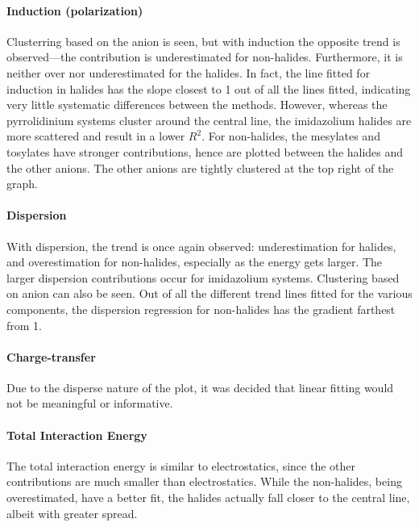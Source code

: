 \paragraph{Induction (polarization)}
Clusterring based on the anion is seen, but with induction the opposite trend is observed---the contribution is underestimated for non-halides.
Furthermore, it is neither over nor underestimated for the halides.
In fact, the line fitted for induction in halides has the slope closest to 1 out of all the lines fitted, indicating very little systematic differences between the methods.
However, whereas the pyrrolidinium systems cluster around the central line, the imidazolium halides are more scattered and result in a lower $R^2$.
For non-halides, the mesylates and tosylates have stronger contributions, hence are plotted between the halides and the other anions. 
The other anions are tightly clustered at the top right of the graph.

\paragraph{Dispersion}
With dispersion, the trend is once again observed: underestimation for halides, and overestimation for non-halides, especially as the energy gets larger.
The larger dispersion contributions occur for imidazolium systems.
Clustering based on anion can also be seen.
Out of all the different trend lines fitted for the various components, the dispersion regression for non-halides has the gradient farthest from 1. 

\paragraph{Charge-transfer}
Due to the disperse nature of the plot, it was decided that linear fitting would not be meaningful or informative.

\paragraph{Total Interaction Energy}
The total interaction energy is similar to electrostatics, since the other contributions are much smaller than electrostatics.
While the non-halides, being overestimated, have a better fit, the halides actually fall closer to the central line, albeit with greater spread.

